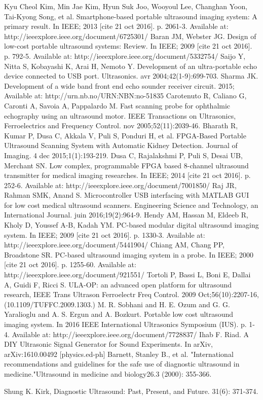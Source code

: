 \documentclass[letterpaper, 10 pt, conference]{ieeeconf} %
\begin{document}
\begin{thebibliography}{99}
 Kyu Cheol Kim, Min Jae Kim, Hyun Suk Joo, Wooyoul Lee, Changhan Yoon, Tai-Kyong Song, et al. Smartphone-based portable ultrasound imaging system: A primary result. In IEEE; 2013 [cite 21 oct 2016]. p. 2061-3. Available at: http://ieeexplore.ieee.org/document/6725301/
 Baran JM, Webster JG. Design of low-cost portable ultrasound systems: Review. In IEEE; 2009 [cite 21 oct 2016]. p. 792-5. Available at: http://ieeexplore.ieee.org/document/5332754/
 Saijo Y, Nitta S, Kobayashi K, Arai H, Nemoto Y. Development of an ultra-portable echo device connected to USB port. Ultrasonics. avr 2004;42(1-9):699-703. 
 Sharma JK. Development of a wide band front end echo sounder receiver circuit. 2015; Available at: http://urn.nb.no/URN:NBN:no-51835
 Carotenuto R, Caliano G, Caronti A, Savoia A, Pappalardo M. Fast scanning probe for ophthalmic echography using an ultrasound motor. IEEE Transactions on Ultrasonics, Ferroelectrics and Frequency Control. nov 2005;52(11):2039-46. 
 Bharath R, Kumar P, Dusa C, Akkala V, Puli S, Ponduri H, et al. FPGA-Based Portable Ultrasound Scanning System with Automatic Kidney Detection. Journal of Imaging. 4 dec 2015;1(1):193-219. 
 Dusa C, Rajalakshmi P, Puli S, Desai UB, Merchant SN. Low complex, programmable FPGA based 8-channel ultrasound transmitter for medical imaging researches. In IEEE; 2014 [cite 21 oct 2016]. p. 252-6. Available at: http://ieeexplore.ieee.org/document/7001850/
 Raj JR, Rahman SMK, Anand S. Microcontroller USB interfacing with MATLAB GUI for low cost medical ultrasound scanners. Engineering Science and Technology, an International Journal. juin 2016;19(2):964-9. 
 Hendy AM, Hassan M, Eldeeb R, Kholy D, Youssef A-B, Kadah YM. PC-based modular digital ultrasound imaging system. In IEEE; 2009 [cite 21 oct 2016]. p. 1330-3. Available at: http://ieeexplore.ieee.org/document/5441904/
 Chiang AM, Chang PP, Broadstone SR. PC-based ultrasound imaging system in a probe. In IEEE; 2000 [cite 21 oct 2016]. p. 1255-60. Available at: http://ieeexplore.ieee.org/document/921551/
 Tortoli P, Bassi L, Boni E, Dallai A, Guidi F, Ricci S. ULA-OP: an advanced open platform for ultrasound research, IEEE Trans Ultrason Ferroelectr Freq Control. 2009 Oct;56(10):2207-16, (10.1109/TUFFC.2009.1303.)
 M. R. Sobhani and H. E. Ozum and G. G. Yaralioglu and A. S. Ergun and A. Bozkurt. Portable low cost ultrasound imaging system. In 2016 IEEE International Ultrasonics Symposium (IUS). p. 1-4. Available at: http://ieeexplore.ieee.org/document/7728837/
 Ihab F. Riad. A DIY Ultrasonic Signal Generator for Sound Experiments. In arXiv, arXiv:1610.00492 [physics.ed-ph]
 Barnett, Stanley B., et al. "International recommendations and guidelines for the safe use of diagnostic ultrasound in medicine."Ultrasound in medicine and biology26.3 (2000): 355-366.

 Shung K. Kirk, Diagnostic Ultrasound: Past, Present, and Future. 31(6): 371-374.


\end{thebibliography}
\end{document}
